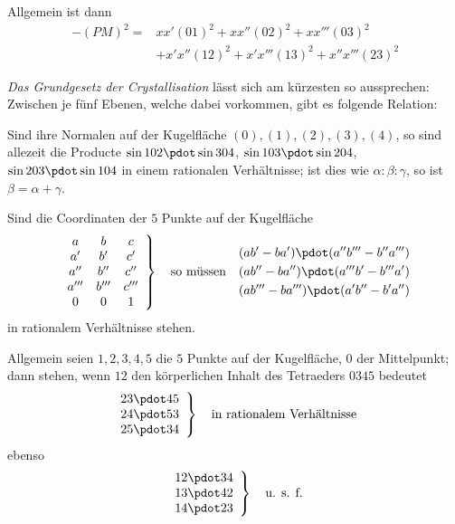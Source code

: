 Allgemein ist dann
\[
\begin{aligned}
-(PM)^2={}&xx'(01)^2+xx''(02)^2+xx'''(03)^2\\
&+x'x''(12)^2+x'x'''(13)^2+x''x'''(23)^2
\end{aligned}
\]

\emph{Das Grundgesetz der Crystallisation} lässt sich am kürzesten so aussprechen: Zwischen je fünf Ebenen, welche dabei vorkommen, gibt es folgende Relation:

Sind ihre Normalen auf der Kugelfläche $(0),(1),(2),(3),(4)$, so sind allezeit die Producte $\sin102\pdot\sin304$, $\sin103\pdot\sin204$, $\sin203\pdot\sin104$ in einem rationalen Verhältnisse; ist dies wie $\alpha:\beta:\gamma$, so ist $\beta=\alpha+\gamma$.

Sind die Coordinaten der $5$ Punkte auf der Kugelfläche
\[
\left.\begin{array}{ccc}
a&b&c\\a'&b'&c'\\a''&b''&c''\\a'''&b'''&c'''\\0&0&1
\end{array}\right\}
\quad\text{so müssen}\quad
\begin{gathered}
(ab'-ba')\pdot(a''b'''-b''a''')\\
(ab''-ba'')\pdot(a'''b'-b'''a')\\
(ab'''-ba''')\pdot(a'b''-b'a'')
\end{gathered}
\]
in rationalem Verhältnisse stehen.

Allgemein seien $1,2,3,4,5$ die $5$ Punkte auf der Kugelfläche, $0$ der Mittelpunkt; dann stehen, wenn $12$ den körperlichen Inhalt des Tetraeders $0345$ bedeutet
\[
\left.\begin{array}{c}23\pdot45\\24\pdot53\\25\pdot34\end{array}\right\}
\quad\text{in rationalem Verhältnisse}
\]
ebenso
\[
\left.\begin{array}{c}12\pdot34\\13\pdot42\\14\pdot23\end{array}\right\}\quad\text{u. s. f.}
\]

